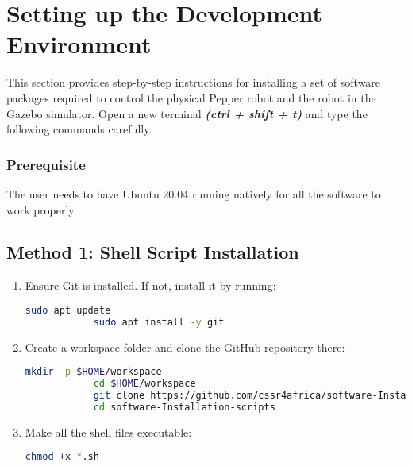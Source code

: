 \documentclass{CSSRforAfrica}
\begin{document}
	\section{Setting up the Development Environment}
	{
		\label{devenv}
		This section provides step-by-step instructions for installing a set of software packages required to control the physical Pepper robot and the robot in the Gazebo simulator. Open a new terminal \textit{\textbf{(ctrl + shift + t)}} and type the following commands carefully. 
		
		\subsubsection*{Prerequisite}
		
		{The user needs to have Ubuntu 20.04 running natively for all the software to work properly.} 
		
		\vspace{1em}
		
		\begingroup
		
		\subsection{Method 1: Shell Script Installation}
		
		\begin{enumerate}
			\item Ensure Git is installed. If not, install it by running:
			\begin{lstlisting}[style=withoutNumbering, language=bash]
			sudo apt update
			sudo apt install -y git
			\end{lstlisting}
			
			\item Create a workspace folder and clone the GitHub repository there:
			\begin{lstlisting}[style=withoutNumbering, language=bash]
			mkdir -p $HOME/workspace
			cd $HOME/workspace
			git clone https://github.com/cssr4africa/software-Installation-scripts.git
			cd software-Installation-scripts
			\end{lstlisting}
			
			\item Make all the shell files executable:
			\begin{lstlisting}[style=withoutNumbering, language=bash]
			chmod +x *.sh
			\end{lstlisting}
			

\end{enumerate}}
\end{document}

